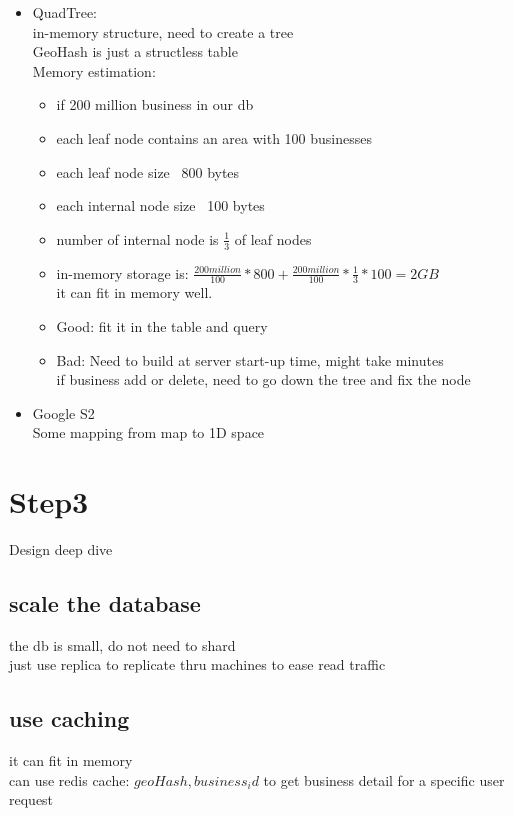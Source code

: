 \documentclass{article}
\begin{document}
\begin{itemize}
\begin{itemize}
\begin{itemize}
        \end{itemize}
    \end{itemize}
    \item QuadTree:\\
    in-memory structure, need to create a tree\\
    GeoHash is just a structless table\\
    Memory estimation:\\
    \begin{itemize}
        \item if 200 million business in our db\\
        \item each leaf node contains an area with 100 businesses\\
        \item each leaf node size ~800 bytes\\
        \item each internal node size ~100 bytes\\
        \item number of internal node is $\frac{1}{3}$ of leaf nodes\\
        \item in-memory storage is: $\frac{200 million}{100}* 800 + \frac{200 million}{100}*\frac{1}{3}*100 = 2GB$\\
        it can fit in memory well.\\
    \end{itemize}
    \begin{itemize}
        \item Good: fit it in the table and query
        \item Bad: Need to build at server start-up time, might take minutes\\
        if business add or delete, need to go down the tree and fix the node\\
    \end{itemize}
    \item Google S2\\
    Some mapping from map to 1D space\\
\end{itemize}
\section{Step3}
Design deep dive\\
\subsection{scale the database}
the db is small, do not need to shard\\
just use replica to replicate thru machines to ease read traffic\\
\subsection{use caching}
it can fit in memory\\
can use redis cache: ${geoHash, business_id}$ to get business detail for a specific user request
\end{document}
